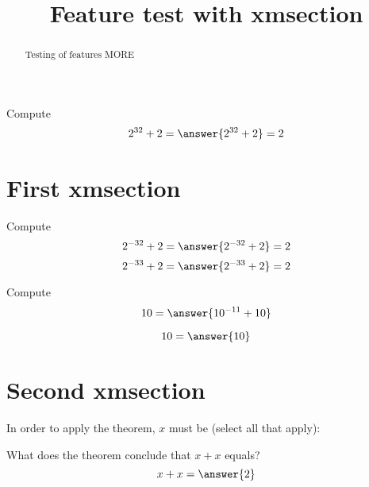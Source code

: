 \documentclass{ximera}
\title{Feature test with xmsection}
\providecommand{\xmsection}{\section}
\begin{document}
\begin{abstract}
    Testing of features MORE
\end{abstract}
\maketitle



\begin{example}
  Compute
  \[
  2^{32}+2 = \answer{2^{32}+2} = 2
  \]
  \end{example}

\xmsection{First xmsection}
  \begin{example}
    Compute
    \[
    2^{-32}+2 = \answer{2^{-32}+2} = 2
    \]
    \[
    2^{-33}+2 = \answer{2^{-33}+2} = 2
    \]
    \end{example}


\begin{example}
  Compute
  \[
  10 = \answer{10^{-11}+10}
  \]
  \end{example}
\begin{problem}
  \[
  10 = \answer{10}
  \]
\end{problem}

\xmsection{Second xmsection}

\begin{question}
  In order to apply the theorem, $x$ must be
  (select all that apply):
  \begin{selectAll}
      \end{selectAll}
      \begin{problem}
      What does the theorem conclude that $x+x$ equals?
      \[
      x + x = \answer{2}
      \]
      \end{problem}
  \end{question}
\begin{exploration}
\end{exploration}
\end{document}
